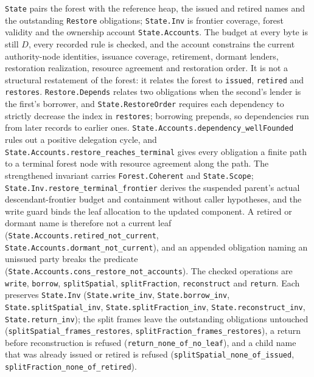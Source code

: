 \documentclass[10pt,a4paper]{article}
\begin{document}
\texttt{State} pairs the forest with the reference heap, the issued and retired
names and the outstanding \texttt{Restore} obligations; \texttt{State.Inv} is
frontier coverage, forest validity and the ownership account
\texttt{State.Accounts}. The budget at every byte is still $D$, every recorded
rule is checked, and the account constrains the current authority-node
identities, issuance coverage, retirement, dormant lenders, restoration
realization, resource agreement and restoration order. It is not a structural
restatement of the forest: it relates the forest to \texttt{issued},
\texttt{retired} and \texttt{restores}. \texttt{Restore.Depends} relates two
obligations when the second's lender is the first's borrower, and
\texttt{State.RestoreOrder} requires each dependency to strictly decrease the
index in \texttt{restores}; borrowing prepends, so dependencies run from later
records to earlier ones. \texttt{State.Accounts.dependency\_wellFounded} rules
out a positive delegation cycle, and
\texttt{State.Accounts.restore\_reaches\_terminal} gives every obligation a
finite path to a terminal forest node with resource agreement along the path.
The strengthened invariant carries \texttt{Forest.Coherent} and
\texttt{State.Scope}; \texttt{State.Inv.restore\_terminal\_frontier} derives the
suspended parent's actual descendant-frontier budget and containment without
caller hypotheses, and the write guard binds the leaf allocation to the updated
component. A retired or
dormant name is therefore not a current leaf
(\texttt{State.Accounts.retired\_not\_current},
\texttt{State.Accounts.dormant\_not\_current}), and an appended obligation naming
an unissued party breaks the predicate
(\texttt{State.Accounts.cons\_restore\_not\_accounts}). The checked operations are
\texttt{write}, \texttt{borrow}, \texttt{splitSpatial}, \texttt{splitFraction},
\texttt{reconstruct} and \texttt{return}. Each preserves \texttt{State.Inv}
(\texttt{State.write\_inv}, \texttt{State.borrow\_inv},
\texttt{State.splitSpatial\_inv}, \texttt{State.splitFraction\_inv},
\texttt{State.reconstruct\_inv}, \texttt{State.return\_inv}); the split frames
leave the outstanding obligations untouched
(\texttt{splitSpatial\_frames\_restores},
\texttt{splitFraction\_frames\_restores}), a return before reconstruction is
refused (\texttt{return\_none\_of\_no\_leaf}), and a child name that was already
issued or retired is refused (\texttt{splitSpatial\_none\_of\_issued},
\texttt{splitFraction\_none\_of\_retired}).
\end{document}
